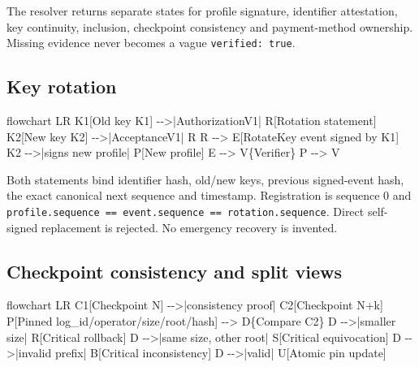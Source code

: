 \documentclass[
]{article}
\newenvironment{Shaded}{}{}
\newcommand{\NormalTok}[1]{#1}
\begin{document}
The resolver returns separate states for profile signature, identifier
attestation, key continuity, inclusion, checkpoint consistency and
payment-method ownership. Missing evidence never becomes a vague
\texttt{verified:\ true}.

\hypertarget{key-rotation}{%
\subsection{Key rotation}\label{key-rotation}}

\begin{Shaded}
\begin{Highlighting}[]
\NormalTok{flowchart LR}
\NormalTok{  K1[Old key K1] {-}{-}\textgreater{}|AuthorizationV1| R[Rotation statement]}
\NormalTok{  K2[New key K2] {-}{-}\textgreater{}|AcceptanceV1| R}
\NormalTok{  R {-}{-}\textgreater{} E[RotateKey event signed by K1]}
\NormalTok{  K2 {-}{-}\textgreater{}|signs new profile| P[New profile]}
\NormalTok{  E {-}{-}\textgreater{} V\{Verifier\}}
\NormalTok{  P {-}{-}\textgreater{} V}
\end{Highlighting}
\end{Shaded}

Both statements bind identifier hash, old/new keys, previous
signed-event hash, the exact canonical next sequence and timestamp.
Registration is sequence 0 and
\texttt{profile.sequence\ ==\ event.sequence\ ==\ rotation.sequence}.
Direct self-signed replacement is rejected. No emergency recovery is
invented.

\hypertarget{checkpoint-consistency-and-split-views}{%
\subsection{Checkpoint consistency and split
views}\label{checkpoint-consistency-and-split-views}}

\begin{Shaded}
\begin{Highlighting}[]
\NormalTok{flowchart LR}
\NormalTok{  C1[Checkpoint N] {-}{-}\textgreater{}|consistency proof| C2[Checkpoint N+k]}
\NormalTok{  P[Pinned log\_id/operator/size/root/hash] {-}{-}\textgreater{} D\{Compare C2\}}
\NormalTok{  D {-}{-}\textgreater{}|smaller size| R[Critical rollback]}
\NormalTok{  D {-}{-}\textgreater{}|same size, other root| S[Critical equivocation]}
\NormalTok{  D {-}{-}\textgreater{}|invalid prefix| B[Critical inconsistency]}
\NormalTok{  D {-}{-}\textgreater{}|valid| U[Atomic pin update]}
\end{Highlighting}
\end{Shaded}
\end{document}
